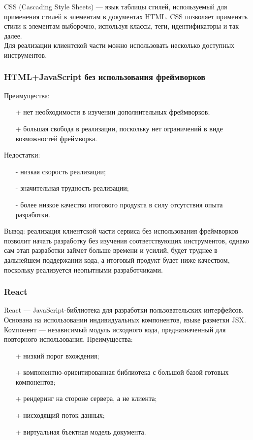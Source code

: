 \documentclass[a4paper,12pt]{article}
\begin{document}
CSS (Cascading Style Sheets) — язык таблицы стилей, используемый для применения стилей к элементам в документах HTML. CSS позволяет применять стили к элементам выборочно, используя классы, теги, идентификаторы и так далее. \cite{website:css}\\

Для реализации клиентской части можно использовать несколько доступных инструментов.
\subsubsection{HTML+JavaScript без использования фреймворков}
Преимущества:
\begin{itemize}
	\item[+] нет необходимости в изучении дополнительных фреймворков;
	\item[+] большая свобода в реализации, поскольку нет ограничений в виде возможностей фреймворка.
\end{itemize}

Недостатки:
\begin{itemize}
	\item[-] низкая скорость реализации;
	\item[-] значительная трудность реализации;
	\item[-] более низкое качество итогового продукта в силу отсутствия опыта разработки.
\end{itemize}

Вывод: реализация клиентской части сервиса без использования фреймворков позволит начать разработку без изучения соответствующих инструментов, однако сам этап разработки займет больше времени и усилий, будет труднее в дальнейшем поддержании кода, а итоговый продукт будет ниже качеством, поскольку реализуется неопытными разработчиками.\\



\subsubsection{React}
React — JavaScript-библиотека для разработки пользовательских интерфейсов. Основана на использовании индивидуальных компонентов, языке разметки JSX. Компонент — независимый модуль исходного кода, предназначенный для повторного использования.
Преимущества:
\begin{itemize}
	\item[+] низкий порог вхождения;
	\item[+] компонентно-ориентированная библиотека с большой базой готовых компонентов;
	\item[+] рендеринг на стороне сервера, а не клиента;
	\item[+] нисходящий поток данных;
	\item[+] виртуальная бъектная модель документа.
\end{itemize}
\end{document}
